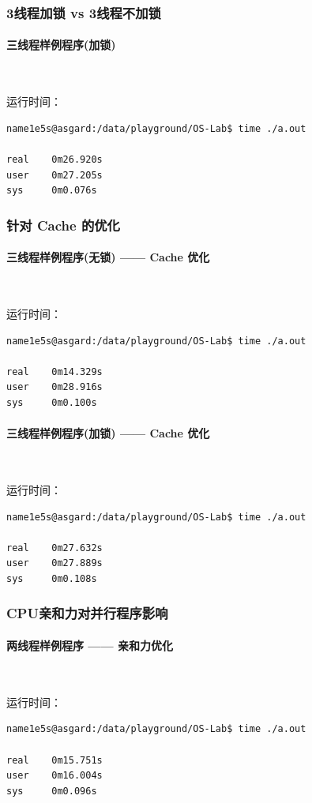 \documentclass[blue,normal,cn]{elegantnote}
\begin{document}
\subsubsection{3线程加锁 vs 3线程不加锁}
\paragraph{三线程样例程序(加锁)}
\ 

运行时间：
\begin{lstlisting}
name1e5s@asgard:/data/playground/OS-Lab$ time ./a.out 

real    0m26.920s
user    0m27.205s
sys     0m0.076s
\end{lstlisting}

\subsubsection{针对 Cache 的优化}
\paragraph{三线程样例程序(无锁) —— Cache 优化}
\ 

运行时间：
\begin{lstlisting}
name1e5s@asgard:/data/playground/OS-Lab$ time ./a.out 

real    0m14.329s
user    0m28.916s
sys     0m0.100s
\end{lstlisting}
\paragraph{三线程样例程序(加锁) —— Cache 优化}
\ 

运行时间：
\begin{lstlisting}
name1e5s@asgard:/data/playground/OS-Lab$ time ./a.out 

real    0m27.632s
user    0m27.889s
sys     0m0.108s
\end{lstlisting}

\subsubsection{CPU亲和力对并行程序影响}
\paragraph{两线程样例程序 —— 亲和力优化}
\ 

运行时间：
\begin{lstlisting}
name1e5s@asgard:/data/playground/OS-Lab$ time ./a.out 

real    0m15.751s
user    0m16.004s
sys     0m0.096s
\end{lstlisting}
\end{document}
